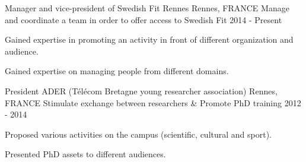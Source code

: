 \begin{cventries}
  \cventry
    {Manager and vice-president of Swedish Fit Rennes}
    {Rennes, FRANCE}
    {Manage and coordinate a team in order to offer access to Swedish Fit}
    {2014 - Present}
    {
      \begin{cvitems}
        \item {Gained expertise in promoting an activity in front of different organization and audience.}
        \item {Gained expertise on managing people from different domains.}
      \end{cvitems}
    }
  \cventry
    {President ADER (T\'{e}l\'{e}com Bretagne young researcher association)}
    {Rennes, FRANCE}
    {Stimulate exchange between researchers \& Promote PhD training}
    {2012 - 2014}
    {
      \begin{cvitems}
        \item {Proposed various activities on the campus (scientific, cultural and sport).}
        \item {Presented PhD assets to different audiences.}
      \end{cvitems}
    }

\end{cventries}
